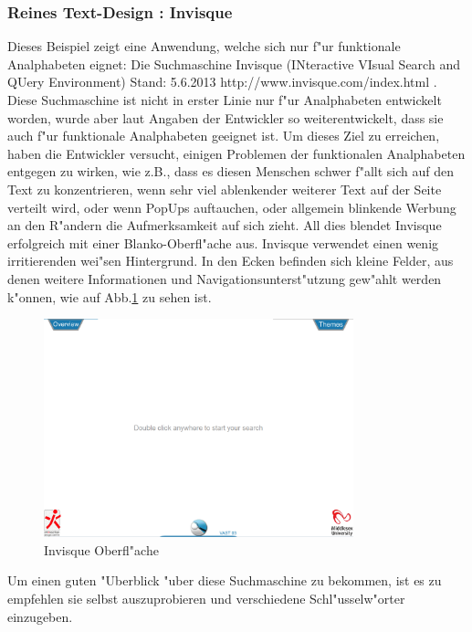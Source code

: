 \newpage

\subsubsection{Reines Text-Design : Invisque}
Dieses Beispiel zeigt eine Anwendung, welche sich nur f"ur funktionale Analphabeten eignet: Die Suchmaschine Invisque (INteractive VIsual Search and QUery Environment)
						{Stand: 5.6.2013}
						{http://www.invisque.com/index.html}{}
.\\
Diese Suchmaschine ist nicht in erster Linie nur f"ur Analphabeten entwickelt worden, wurde aber laut Angaben der Entwickler so weiterentwickelt, dass sie auch f"ur funktionale Analphabeten geeignet ist. Um dieses Ziel zu erreichen, haben die Entwickler versucht, einigen Problemen der funktionalen Analphabeten entgegen zu wirken, wie z.B., dass es diesen Menschen schwer f"allt sich auf den Text zu konzentrieren, wenn sehr viel ablenkender weiterer Text auf der Seite verteilt wird, oder wenn PopUps auftauchen, oder allgemein blinkende Werbung an den R"andern die Aufmerksamkeit auf sich zieht. All dies blendet Invisque erfolgreich mit einer Blanko-Oberfl"ache aus. Invisque verwendet einen wenig irritierenden wei"sen Hintergrund. In den Ecken befinden sich kleine Felder, aus denen weitere Informationen und Navigationsunterst"utzung gew"ahlt werden k"onnen, wie auf Abb.\ref{fig:Invisque} zu sehen ist.

\begin{figure}[h]
	\centering
		\includegraphics[width=0.80\textwidth]{Daten/Inisque.PNG}
	\caption{Invisque Oberfl"ache}
	\label{fig:Invisque}
\end{figure}

Um einen guten "Uberblick "uber diese Suchmaschine zu bekommen, ist es zu empfehlen sie selbst auszuprobieren und verschiedene Schl"usselw"orter einzugeben.

